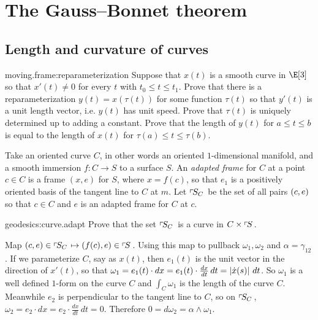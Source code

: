 \chapter{The Gauss--Bonnet theorem}\label{chapter:Gauss.Bonnet}%


\section{Length and curvature of curves}
\begin{problem}{moving.frame:reparameterization}
Suppose that \(x(t)\) is a smooth curve in \(\E[3]\) so that \(x'(t) \ne 0\) for every \(t\) with \(t_0 \le t \le t_1\).
Prove that there is a reparameterization \(y(t)=x(\tau(t))\) for some function \(\tau(t)\) so that \(y'(t)\) is a unit length vector, i.e. \(y(t)\) has unit speed.
Prove that \(\tau(t)\) is uniquely determined up to adding a constant.
Prove that the length of \(y(t)\) for \(a \le t \le b\) is equal to the length of \(x(t)\) for \(\tau(a) \le t \le \tau(b)\).
\end{problem}
Take an oriented curve \(C\), in other words an oriented \(1\)-dimensional manifold, and a smooth immersion \(f \colon C \to S\) to a surface \(S\).
An \emph{adapted frame}%
for \(C\) at a point \(c \in C\) is a frame \((x,e)\) for \(S\), where \(x=f(c)\), so that \(e_1\) is a positively oriented basis of the tangent line to \(C\) at \(m\).
Let \(\adaptedFrameBundle{C}{S}\) be the set of all pairs \(\pr{c,e}\) so that \(c \in C\) and \(e\) is an adapted frame for \(C\) at \(c\).
\begin{problem}{geodesics:curve.adapt}
Prove that the set \(\adaptedFrameBundle{C}{S}\) is a curve in \(C \times \frameBundle{S}\).
\end{problem}
Map \(\pr{c,e} \in \adaptedFrameBundle{C}{S} \mapsto \pr{f(c),e} \in \frameBundle{S}\).
Using this map to pullback \(\omega_1, \omega_2\) and \(\alpha=\gamma_{12}\).
If we parameterize \(C\), say as \(x(t)\), then \(e_1(t)\) is the unit vector in the direction of \(x'(t)\), so that \(\omega_1=e_1(t) \cdot dx=e_1(t) \cdot \frac{dx}{dt} \, dt=\norm{\dot{x}(s)} \, dt\).
So \(\omega_1\) is a well defined \(1\)-form on the curve \(C\) and \(\int_C \omega_1\) is the length of the curve \(C\).
Meanwhile \(e_2\) is perpendicular to the tangent line to \(C\), so on \(\adaptedFrameBundle{C}{S}\), \(\omega_2=e_2 \cdot dx=e_2 \cdot \frac{dx}{dt} \, dt=0\).
Therefore \(0=d\omega_2=\alpha \wedge \omega_1\).

